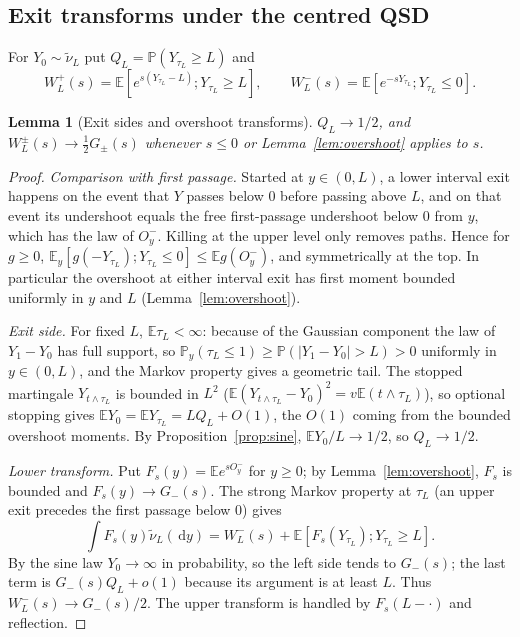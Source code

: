 \documentclass[11pt,a4paper]{article}
\newtheorem{lemma}[theorem]{Lemma}
\theoremstyle{definition}
\theoremstyle{remark}
\newcommand{\E}{\mathbb E}
\newcommand{\Pp}{\mathbb P}
\newcommand{\1}{\mathbf 1}
\newcommand{\dd}{\,\mathrm d}
\begin{document}
\subsection{Exit transforms under the centred QSD}
For $Y_0\sim\widetilde\nu_L$ put $Q_L=\Pp(Y_{\tau_L}\ge L)$ and
\[
 W_L^+(s)=\E[e^{s(Y_{\tau_L}-L)};Y_{\tau_L}\ge L],\qquad W_L^-(s)=\E[e^{-sY_{\tau_L}};Y_{\tau_L}\le0].
\]
\begin{lemma}[Exit sides and overshoot transforms]\label{lem:exit}
$Q_L\to1/2$, and $W_L^\pm(s)\to\frac12G_\pm(s)$ whenever $s\le0$ or Lemma~\ref{lem:overshoot} applies to $s$.
\end{lemma}
\begin{proof}
\emph{Comparison with first passage.} Started at $y\in(0,L)$, a lower interval exit happens on the event that $Y$ passes below $0$ before passing above $L$, and on that event its undershoot equals the free first-passage undershoot below $0$ from $y$, which has the law of $O^-_y$. Killing at the upper level only removes paths. Hence for $g\ge0$, $\E_y[g(-Y_{\tau_L});Y_{\tau_L}\le0]\le\E g(O^-_y)$, and symmetrically at the top. In particular the overshoot at either interval exit has first moment bounded uniformly in $y$ and $L$ (Lemma~\ref{lem:overshoot}).

\emph{Exit side.} For fixed $L$, $\E\tau_L<\infty$: because of the Gaussian component the law of $Y_1-Y_0$ has full support, so $\Pp_y(\tau_L\le1)\ge\Pp(|Y_1-Y_0|>L)>0$ uniformly in $y\in(0,L)$, and the Markov property gives a geometric tail. The stopped martingale $Y_{t\wedge\tau_L}$ is bounded in $L^2$ ($\E(Y_{t\wedge\tau_L}-Y_0)^2=v\E(t\wedge\tau_L)$), so optional stopping gives $\E Y_0=\E Y_{\tau_L}=LQ_L+O(1)$, the $O(1)$ coming from the bounded overshoot moments. By Proposition~\ref{prop:sine}, $\E Y_0/L\to1/2$, so $Q_L\to1/2$.

\emph{Lower transform.} Put $F_s(y)=\E e^{sO^-_y}$ for $y\ge0$; by Lemma~\ref{lem:overshoot}, $F_s$ is bounded and $F_s(y)\to G_-(s)$. The strong Markov property at $\tau_L$ (an upper exit precedes the first passage below $0$) gives
\[
 \int F_s(y)\widetilde\nu_L(\dd y)=W_L^-(s)+\E[F_s(Y_{\tau_L});Y_{\tau_L}\ge L].
\]
By the sine law $Y_0\to\infty$ in probability, so the left side tends to $G_-(s)$; the last term is $G_-(s)Q_L+o(1)$ because its argument is at least $L$. Thus $W_L^-(s)\to G_-(s)/2$. The upper transform is handled by $F_s(L-\cdot)$ and reflection.
\end{proof}
\end{document}
